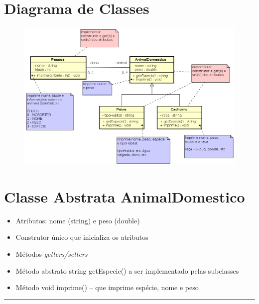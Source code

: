 \documentclass[12pt]{article}
\begin{document}
\thispagestyle{empty}

\section*{Diagrama de Classes}

\begin{figure}[htbp]
    \centering \includegraphics[width=15cm]{animal.png}
\end{figure}

\newpage

\section*{Classe Abstrata {\sf AnimalDomestico}}

\begin{itemize}

\item Atributos: nome ({\sf string}) e peso ({\sf double})

\item Construtor único que inicializa os atributos

\item Métodos {\it getters/setters}

\item Método abstrato {\sf string getEspecie()} a ser implementado pelas subclasses

\item Método {\sf void imprime()} -- que imprime espécie, nome e peso

\end{itemize}

\par\noindent\rule{\textwidth}{0.4pt}
\end{document}
